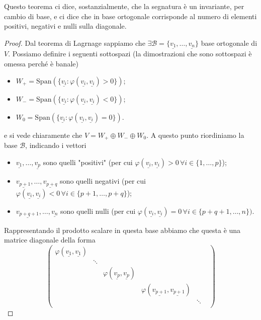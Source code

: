 \begin{remark}
	Questo teorema ci dice, sostanzialmente, che la segnatura è un invariante, per cambio di base, e ci dice che in base ortogonale corrisponde al numero di elementi positivi, negativi e nulli sulla diagonale.
\end{remark}
\begin{proof}
	Dal teorema di Lagrnage sappiamo che $\exists \mathcal{B} = \{ \underline{v_1}, \ldots, \underline{v_n} \}$ base ortogonale di $V$. Possiamo definire i seguenti sottospazi (la dimostrazioni che sono sottospazi è omessa perché è banale)
	\begin{itemize}
		\item $W_+ = \text{Span}(\{ \underline{v_i} : \varphi(\underline{v_i}, \underline{v_i}) > 0 \})$;
		\item $W_- = \text{Span}(\{ \underline{v_i} : \varphi(\underline{v_i}, \underline{v_i}) < 0 \})$;
		\item $W_0 = \text{Span}(\{ \underline{v_i} : \varphi(\underline{v_i}, \underline{v_i}) = 0 \})$.
	\end{itemize}
	e si vede chiaramente che $V = W_+ \oplus W_- \oplus W_0$. A questo punto riordiniamo la base $\mathcal{B}$, indicando i vettori
	\begin{itemize}
		\item $\underline{v_1}, \ldots, \underline{v_p}$ sono quelli "positivi" (per cui $\varphi(\underline{v_i}, \underline{v_i}) > 0 \, \forall i \in \{ 1, \ldots, p\}$);
		\item $\underline{v_{p+1}}, \ldots, \underline{v_{p + q}}$ sono quelli negativi (per cui $\varphi(\underline{v_i}, \underline{v_i}) < 0 \, \forall i \in \{ p+1, \ldots, p+q\}$);
		\item $\underline{v_{p+q+1}}, \ldots, \underline{v_{n}}$ sono quelli nulli (per cui $\varphi(\underline{v_i}, \underline{v_i}) = 0 \, \forall i \in \{ p + q + 1, \ldots, n\})$.
	\end{itemize}
	Rappresentando il prodotto scalare in questa base abbiamo che questa è una matrice diagonale della forma
	$$
		\begin{pmatrix}
			\varphi(\underline{v_1}, \underline{v_1}) & & & \\
			& \ddots & & \\
			& & \varphi(\underline{v_p}, \underline{v_p}) & & \\
			& & & \varphi(\underline{v_{p+1}}, \underline{v_{p+1}}) & \\
			& & & & \ddots & \\

\end{pmatrix}$$
\end{proof}
